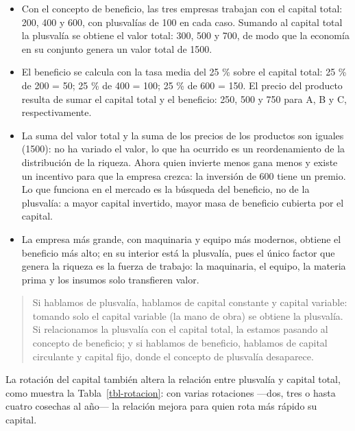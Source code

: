 \documentclass[
  man,
  floatsintext,
  longtable,
  a4paper,
  nolmodern,
  notxfonts,
  notimes,
  12pt,
  colorlinks=true,linkcolor=blue,citecolor=blue,urlcolor=blue]{apa7}
\begin{document}
\begin{itemize}
\item
  Con el concepto de beneficio, las tres empresas trabajan con el
  capital total: 200, 400 y 600, con plusvalías de 100 en cada caso.
  Sumando al capital total la plusvalía se obtiene el valor total: 300,
  500 y 700, de modo que la economía en su conjunto genera un valor
  total de 1500.
\item
  El beneficio se calcula con la tasa media del 25 \% sobre el capital
  total: 25 \% de 200 = 50; 25 \% de 400 = 100; 25 \% de 600 = 150. El
  precio del producto resulta de sumar el capital total y el beneficio:
  250, 500 y 750 para A, B y C, respectivamente.
\item
  La suma del valor total y la suma de los precios de los productos son
  iguales (1500): no ha variado el valor, lo que ha ocurrido es un
  reordenamiento de la distribución de la riqueza. Ahora quien invierte
  menos gana menos y existe un incentivo para que la empresa crezca: la
  inversión de 600 tiene un premio. Lo que funciona en el mercado es la
  búsqueda del beneficio, no de la plusvalía: a mayor capital invertido,
  mayor masa de beneficio cubierta por el capital.
\item
  La empresa más grande, con maquinaria y equipo más modernos, obtiene
  el beneficio más alto; en su interior está la plusvalía, pues el único
  factor que genera la riqueza es la fuerza de trabajo: la maquinaria,
  el equipo, la materia prima y los insumos solo transfieren valor.
\end{itemize}

\begin{quote}
Si hablamos de plusvalía, hablamos de capital constante y capital
variable: tomando solo el capital variable (la mano de obra) se obtiene
la plusvalía. Si relacionamos la plusvalía con el capital total, la
estamos pasando al concepto de beneficio; y si hablamos de beneficio,
hablamos de capital circulante y capital fijo, donde el concepto de
plusvalía desaparece.
\end{quote}

La rotación del capital también altera la relación entre plusvalía y
capital total, como muestra la Tabla~\ref{tbl-rotacion}: con varias
rotaciones ---dos, tres o hasta cuatro cosechas al año--- la relación
mejora para quien rota más rápido su capital.
\end{document}
